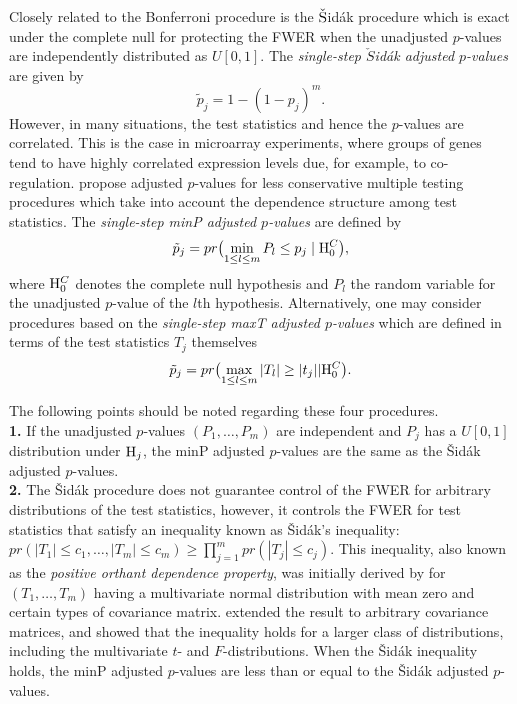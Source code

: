 \documentclass[11pt]{article}
\begin{document}
Closely related to the Bonferroni procedure is the $\check{\rm
  S}$id\'{a}k procedure which is exact under the complete null for protecting the FWER when the unadjusted $p$-values are independently distributed as $U[0,1]$. The {\it single-step $\check{S}$id\'{a}k adjusted $p$-values} are given by 
\begin{equation}\label{ess}
\tilde{p}_j = 1 - (1-p_j)^m.
\end{equation}
However, in many situations, the test statistics and hence the
$p$-values are correlated. This is the case in microarray experiments,
where groups of genes tend to have highly correlated expression levels
due, for example, to co-regulation. \cite{Westfall&Young93} propose adjusted $p$-values for less conservative multiple testing procedures which take into account the dependence structure among test statistics. The {\it single-step minP adjusted $p$-values} are defined by
\begin{equation}\label{eminPs}
 \tilde{p}_j = pr\bigl(\min_{1 \leq l \leq m} P_l \leq p_j \mid {\rm H}_0^C\bigr),
\end{equation}
where ${\rm H}_0^C$ denotes the complete null hypothesis and  $P_l$ 
the random variable for the unadjusted $p$-value of the $l$th hypothesis. Alternatively, one may consider procedures based on the {\it single-step maxT adjusted $p$-values} which are defined in terms of the test statistics $T_j$ themselves
\begin{equation}\label{emaxTs}
\tilde{p}_j = pr\bigl(\max_{1 \leq l \leq m} |T_l| \geq |t_j| | {\rm H}_0^C\bigr).
\end{equation}

The following points should be noted regarding these four procedures.\\

{\bf 1.} If the unadjusted $p$-values $(P_1, \ldots, P_m)$ are independent and $P_j$ has a $U[0,1]$ distribution under ${\rm H}_j$, the minP adjusted $p$-values are the same as the \v{S}id\'{a}k adjusted $p$-values. \\

{\bf 2.} The \v{S}id\'{a}k procedure does not guarantee control of the
FWER for arbitrary distributions of the test statistics, however, it
controls the FWER for test statistics that satisfy an inequality known
as \v{S}id\'{a}k's inequality: $pr(|T_1| \leq c_1, \ldots, |T_m| \leq
c_m) \geq \prod_{j=1}^m pr(|T_j| \leq c_j)$. This inequality, also
known as the {\it positive orthant dependence property}, was initially
derived by \cite{Dunn58} for $(T_1,\ldots,T_m)$ having a
multivariate normal distribution with mean zero and certain types of
covariance matrix. \cite{Sidak67} extended the result to
arbitrary covariance matrices, and \cite{Jogdeo77} showed that
the inequality holds for a larger class of distributions, including
the multivariate $t$- and $F$-distributions. When the \v{S}id\'{a}k
inequality holds, the minP adjusted $p$-values are less than or equal
to the \v{S}id\'{a}k adjusted $p$-values.\\
\end{document}
